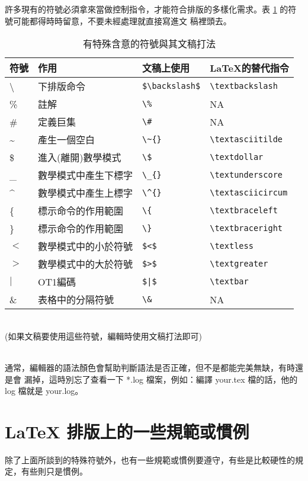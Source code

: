 \documentclass[12pt, a4paper]{report}
\begin{document}
    許多現有的符號必須拿來當做控制指令，才能符合排版的多樣化需求。表
      \ref{tb:specialChar} 的符號可能都得時時留意，不要未經處理就直接寫進文
      稿裡頭去。
    \begin{table}[h]
      \caption{有特殊含意的符號與其文稿打法}\label{tb:specialChar}
      \centering
      \begin{tabular}{|l|l|l|l|}
        \hline
        符號 & 作用 & 文稿上使用 & LaTeX的替代指令 \\ \hline
        \textbackslash & 下排版命令 & \verb+$\backslash$+ 
          & \verb+\textbackslash+ \\ \hline
        \% & 註解 & \verb+\%+ & NA \\ \hline
        \# & 定義巨集 & \verb+\#+ & NA \\ \hline
        \~{} & 產生一個空白 & \verb+\~{}+ & \verb+\textasciitilde+ \\ 
        \hline
        \$ & 進入(離開)數學模式 & \verb+\$+ & \verb+\textdollar+ \\ 
        \hline
        \_{} & 數學模式中產生下標字	 & \verb+\_{}+ 
          & \verb+\textunderscore+ \\ \hline
        \^{} & 數學模式中產生上標字	 & \verb+\^{}+ 
          & \verb+\textasciicircum+ \\ \hline
        \{ & 標示命令的作用範圍 & \verb+\{+ 
          & \verb+\textbraceleft+ \\ \hline
        \} & 標示命令的作用範圍 & \verb+\}+ 
          & \verb+\textbraceright+ \\ \hline
        $<$ & 數學模式中的小於符號 & \verb+$<$+ 
          & \verb+\textless+ \\ \hline
        $>$ & 數學模式中的大於符號	 & \verb+$>$+ 
          & \verb+\textgreater+ \\ \hline
        $|$ & OT1編碼 & \verb+$|$+ & \verb+\textbar+ \\ \hline
        \& & 表格中的分隔符號 & \verb+\&+ & NA \\ \hline
      \end{tabular}\\
      (如果文稿要使用這些符號，編輯時使用文稿打法即可)
    \end{table}\\
    通常，編輯器的語法顏色會幫助判斷語法是否正確，但不是都能完美無缺，有時還是會
      漏掉，這時別忘了查看一下 *.log 檔案，例如：編譯 your.tex 檔的話，他的 
      log 檔就是 your.log。
  \section{LaTeX 排版上的一些規範或慣例}
    除了上面所談到的特殊符號外，也有一些規範或慣例要遵守，有些是比較硬性的規
      定，有些則只是慣例。
\end{document}
